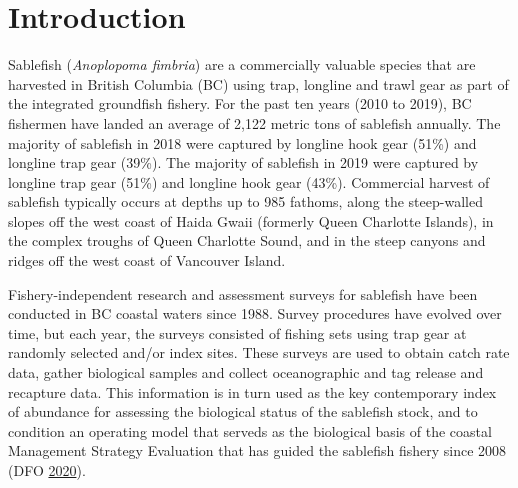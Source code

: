 \documentclass[12pt]{article}\usepackage[]{graphicx}\usepackage[]{color}
\begin{document}

\frontmatter


\renewcommand{\headrulewidth}{0.5pt}  %
\renewcommand{\footrulewidth}{0.5pt}  %

\hypertarget{introduction}{%
\section{Introduction}\label{introduction}}

Sablefish (\emph{Anoplopoma fimbria}) are a commercially valuable species that are harvested in British Columbia (BC) using trap, longline and trawl gear as part of the integrated groundfish fishery. For the past ten years (2010 to 2019), BC fishermen have landed an average of 2,122 metric tons of sablefish annually. The majority of sablefish in 2018 were captured by longline hook gear (51\%) and longline trap gear (39\%). The majority of sablefish in 2019 were captured by longline trap gear (51\%) and longline hook gear (43\%). Commercial harvest of sablefish typically occurs at depths up to 985 fathoms, along the steep-walled slopes off the west coast of Haida Gwaii (formerly Queen Charlotte Islands), in the complex troughs of Queen Charlotte Sound, and in the steep canyons and ridges off the west coast of Vancouver Island.

Fishery-independent research and assessment surveys for sablefish have been conducted in BC coastal waters since 1988. Survey procedures have evolved over time, but each year, the surveys consisted of fishing sets using trap gear at randomly selected and/or index sites. These surveys are used to obtain catch rate data, gather biological samples and collect oceanographic and tag release and recapture data. This information is in turn used as the key contemporary index of abundance for assessing the biological status of the sablefish stock, and to condition an operating model that serveds as the biological basis of the coastal Management Strategy Evaluation that has guided the sablefish fishery since 2008 (DFO \protect\hyperlink{ref-dfo2020}{2020}).
\end{document}
